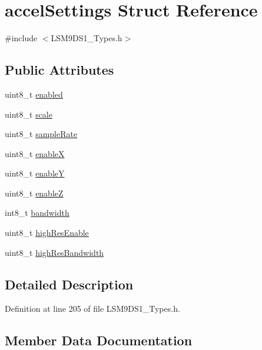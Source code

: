 \hypertarget{structaccel_settings}{}\section{accel\+Settings Struct Reference}
\label{structaccel_settings}


{\ttfamily \#include $<$L\+S\+M9\+D\+S1\+\_\+\+Types.\+h$>$}

\subsection*{Public Attributes}
\begin{DoxyCompactItemize}
\item 
uint8\+\_\+t \hyperlink{structaccel_settings_a6ecaf7abfbaf7e74c6986fd93798ad4b}{enabled}
\item 
uint8\+\_\+t \hyperlink{structaccel_settings_a3a0a38e5e32ad21fcf8e880f37c0de1e}{scale}
\item 
uint8\+\_\+t \hyperlink{structaccel_settings_a51704cb40f1e72ec298f601fedcc6092}{sample\+Rate}
\item 
uint8\+\_\+t \hyperlink{structaccel_settings_a8cd5546cda8657ad2405d378fc815b9a}{enableX}
\item 
uint8\+\_\+t \hyperlink{structaccel_settings_a3f9ff5abfde83c5a59808faeb5ad4c6c}{enableY}
\item 
uint8\+\_\+t \hyperlink{structaccel_settings_abdb5ee5fb9a802315d8340ea5d83b587}{enableZ}
\item 
int8\+\_\+t \hyperlink{structaccel_settings_ab64c80f62ecfeb3041744febaed9407b}{bandwidth}
\item 
uint8\+\_\+t \hyperlink{structaccel_settings_ad165444ae7996ff6160be01d77d33b62}{high\+Res\+Enable}
\item 
uint8\+\_\+t \hyperlink{structaccel_settings_a3925a8342b5a4b3caecd187e729954f3}{high\+Res\+Bandwidth}
\end{DoxyCompactItemize}


\subsection{Detailed Description}


Definition at line 205 of file L\+S\+M9\+D\+S1\+\_\+\+Types.\+h.



\subsection{Member Data Documentation}
